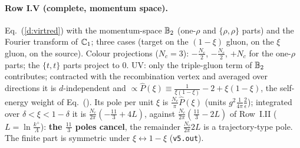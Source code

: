 \paragraph{Row I.V (complete, momentum space).} Eq.~(\ref{d:virtred}) with the momentum-space $\mathbb{B}_2$ (one-$\rho$ and $\{\rho,\rho\}$ parts) and the Fourier transform of $\mathbb{C}_1$; three cases (target on the $(1-\xi)$ gluon, on the $\xi$ gluon, on the source). Colour projections ($N_c=3$): $-\frac{N_c}{2}$, $-\frac{N_c}{2}$, $+N_c$ for the one-$\rho$ parts; the $\{t,t\}$ parts project to $0$. UV: only the triple-gluon term of $\mathbb{B}_2$ contributes; contracted with the recombination vertex and averaged over directions it is $d$-independent and $\propto\hat P(\xi)\equiv\frac{1}{\xi(1-\xi)}-2+\xi(1-\xi)$, the self-energy weight of Eq.~(). Its pole per unit $\xi$ is $\frac{N_c}{\pi}\hat P(\xi)$ (units $g^2\frac{1}{4\pi}\frac2\epsilon$); integrated over $\delta<\xi<1-\delta$ it is $\frac{N_c}{2\pi}(-\frac{11}{3}+4L)$, against $\frac{N_c}{2\pi}(\frac{11}{3}-2L)$ of Row~I.II ($L=\ln\frac{k^+}{\Lambda}$): \textbf{the $\frac{11}{3}$ poles cancel}, the remainder $\frac{N_c}{2\pi}2L$ is a trajectory-type pole. The finite part is symmetric under $\xi\leftrightarrow1-\xi$ (\texttt{v5.out}).

